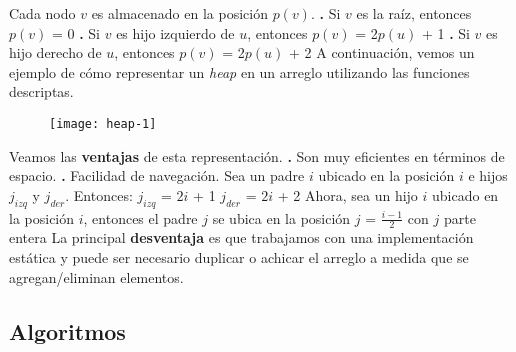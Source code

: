 \documentclass[10pt,a4paper]{article}
\begin{document}
Cada nodo $v$ es almacenado en la posición $p(v)$.
\newline
\newline
\textbf{.} Si $v$ es la raíz, entonces $p(v)$ = 0
\newline
\newline
\textbf{.} Si $v$ es hijo izquierdo de $u$, entonces $p(v)$ = 2$p(u)$ + 1 
\newline
\newline
\textbf{.} Si $v$ es hijo derecho de $u$, entonces $p(v)$ = 2$p(u)$ + 2
\newline
\newline
A continuación, vemos un ejemplo de cómo representar un \textit{heap} en un arreglo utilizando las funciones descriptas.
\newline
\begin{figure}[h]
	\centering
\texttt{[image: heap-1]}
	\label{drivers1}
\end{figure}
\newline
\newline
Veamos las \textbf{ventajas} de esta representación.
\newline
\newline
\textbf{.} Son muy eficientes en términos de espacio.
\newline
\newline
\textbf{.} Facilidad de navegación. 
\newline
\newline
Sea un padre $i$ ubicado en la posición $i$ e hijos $j_{izq}$ y $j_{der}$. Entonces:
\newline
\newline
$j_{izq}$ = $2i$ + 1
\newline
\newline
$j_{der}$ = $2i$ + 2
\newline
\newline
Ahora, sea un hijo $i$ ubicado en la posición $i$, entonces el padre $j$ se ubica en la posición $j$ = $\displaystyle \frac{i-1}{2}$ con $j$ parte entera
\newline
\newline
La principal \textbf{desventaja} es que trabajamos con una implementación estática y puede ser necesario duplicar o achicar el arreglo a medida que se agregan/eliminan elementos.
\subsection{Algoritmos}
\end{document}
